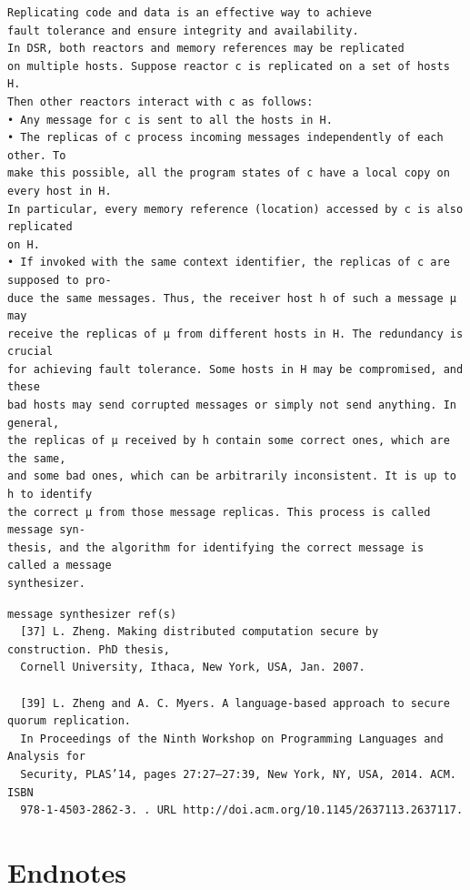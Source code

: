\documentclass[%
dvipsnames]{article}
\theoremstyle{definition}
\newenvironment{theendnotes}{}{}%
\newenvironment{theapx}{}{}%
\begin{document}
\begin{theapx}
\begin{verbatim}
Replicating code and data is an effective way to achieve
fault tolerance and ensure integrity and availability.
In DSR, both reactors and memory references may be replicated
on multiple hosts. Suppose reactor c is replicated on a set of hosts H.
Then other reactors interact with c as follows:
• Any message for c is sent to all the hosts in H.
• The replicas of c process incoming messages independently of each other. To
make this possible, all the program states of c have a local copy on every host in H.
In particular, every memory reference (location) accessed by c is also replicated
on H.
• If invoked with the same context identifier, the replicas of c are supposed to pro-
duce the same messages. Thus, the receiver host h of such a message µ may
receive the replicas of µ from different hosts in H. The redundancy is crucial
for achieving fault tolerance. Some hosts in H may be compromised, and these
bad hosts may send corrupted messages or simply not send anything. In general,
the replicas of µ received by h contain some correct ones, which are the same,
and some bad ones, which can be arbitrarily inconsistent. It is up to h to identify
the correct µ from those message replicas. This process is called message syn-
thesis, and the algorithm for identifying the correct message is called a message
synthesizer.
\end{verbatim}

\begin{verbatim}
message synthesizer ref(s)
  [37] L. Zheng. Making distributed computation secure by construction. PhD thesis,
  Cornell University, Ithaca, New York, USA, Jan. 2007.

  [39] L. Zheng and A. C. Myers. A language-based approach to secure quorum replication.
  In Proceedings of the Ninth Workshop on Programming Languages and Analysis for
  Security, PLAS’14, pages 27:27–27:39, New York, NY, USA, 2014. ACM. ISBN
  978-1-4503-2862-3. . URL http://doi.acm.org/10.1145/2637113.2637117.
\end{verbatim}



  
\end{theapx}
\begin{theendnotes}

\section{Endnotes}
\printendnotes

\end{theendnotes}



\printbibliography
\end{document}
